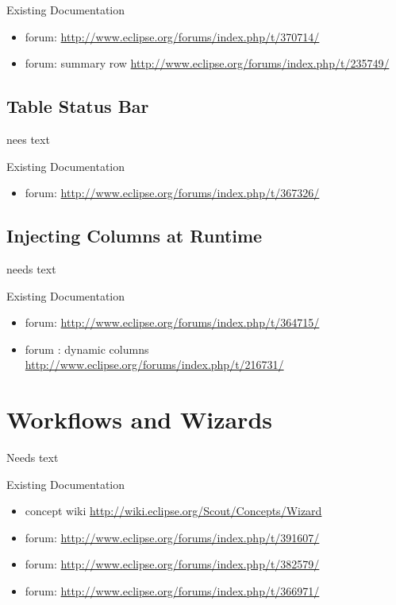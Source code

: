 \documentclass[a4paper,10pt,twoside]{book}
\begin{document}
\noindent Existing Documentation
\begin{itemize}
  \item forum: \url{http://www.eclipse.org/forums/index.php/t/370714/}
  \item forum: summary row \url{http://www.eclipse.org/forums/index.php/t/235749/}
\end{itemize}

\subsection{Table Status Bar}
nees text

\noindent Existing Documentation
\begin{itemize}
  \item forum: \url{http://www.eclipse.org/forums/index.php/t/367326/}
\end{itemize}

\subsection{Injecting Columns at Runtime}
needs text

\noindent Existing Documentation
\begin{itemize}
  \item forum: \url{http://www.eclipse.org/forums/index.php/t/364715/}
  \item forum : dynamic columns \url{http://www.eclipse.org/forums/index.php/t/216731/}
\end{itemize}

\section{Workflows and Wizards}
Needs text

\noindent Existing Documentation
\begin{itemize}
  \item concept wiki \url{http://wiki.eclipse.org/Scout/Concepts/Wizard}
  \item forum: \url{http://www.eclipse.org/forums/index.php/t/391607/}
  \item forum: \url{http://www.eclipse.org/forums/index.php/t/382579/}
  \item forum: \url{http://www.eclipse.org/forums/index.php/t/366971/}
\end{itemize}


\end{document}
